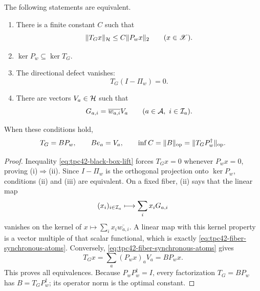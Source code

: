 \begin{theorem}
\label{thm:tpc42-factorization-criterion}
The following statements are equivalent.
\begin{enumerate}[label=(\roman*)]
 \item There is a finite constant \(C\) such that
 \begin{equation}
  \|T_Gx\|_{\mathcal H}\le C\|P_wx\|_2
  \qquad(x\in\mathscr X).
  \label{eq:tpc42-black-box-lift}
 \end{equation}
 \item \(\ker P_w\subseteq\ker T_G\).
 \item The directional defect vanishes:
 \begin{equation}
  T_G(I-\Pi_w)=0.
  \label{eq:tpc42-defect-vanishes}
 \end{equation}
 \item There are vectors \(V_a\in\mathcal H\) such that
 \begin{equation}
  G_{a,i}=\overline{w_{a,i}}V_a
  \qquad(a\in\mathcal A,\ i\in\mathcal I_a).
  \label{eq:tpc42-fiber-synchronous-atoms}
 \end{equation}
\end{enumerate}
When these conditions hold,
\begin{equation}
 T_G=BP_w,
 \qquad
 Be_a=V_a,
 \qquad
 \inf C=\|B\|_{\mathrm{op}}=\|T_GP_w^\dagger\|_{\mathrm{op}}.
 \label{eq:tpc42-optimal-factor-constant}
\end{equation}
\end{theorem}

\begin{proof}
Inequality \eqref{eq:tpc42-black-box-lift} forces \(T_Gx=0\) whenever
\(P_wx=0\), proving (i)\(\Rightarrow\)(ii).  Since \(I-\Pi_w\) is the
orthogonal projection onto \(\ker P_w\), conditions (ii) and (iii) are
equivalent.  On a fixed fiber, (ii) says that the linear map
\begin{equation}
 (x_i)_{i\in\mathcal I_a}\longmapsto\sum_i x_iG_{a,i}
 \label{eq:tpc42-one-fiber-map}
\end{equation}
vanishes on the kernel of
\(x\mapsto\sum_i x_i\overline{w_{a,i}}\).  A linear map with this kernel
property is a vector multiple of that scalar functional, which is exactly
\eqref{eq:tpc42-fiber-synchronous-atoms}.  Conversely,
\eqref{eq:tpc42-fiber-synchronous-atoms} gives
\begin{equation}
 T_Gx=\sum_a(P_wx)_aV_a=BP_wx.
 \label{eq:tpc42-factor-through-P}
\end{equation}
This proves all equivalences.  Because \(P_wP_w^\dagger=I\), every
factorization \(T_G=BP_w\) has \(B=T_GP_w^\dagger\); its operator norm is
the optimal constant.
\end{proof}

